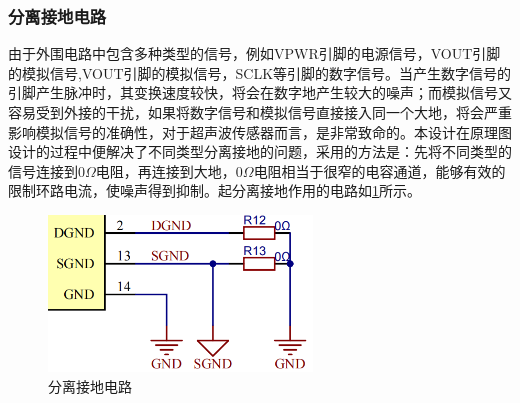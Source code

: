 \subsubsection{分离接地电路}
由于外围电路中包含多种类型的信号，例如VPWR引脚的电源信号，VOUT引脚的模拟信号,VOUT引脚的模拟信号，SCLK等引脚的数字信号。当产生数字信号的引脚产生脉冲时，其变换速度较快，将会在数字地产生较大的噪声；而模拟信号又容易受到外接的干扰，如果将数字信号和模拟信号直接接入同一个大地，将会严重影响模拟信号的准确性，对于超声波传感器而言，是非常致命的。本设计在原理图设计的过程中便解决了不同类型分离接地的问题，采用的方法是：先将不同类型的信号连接到0$\Omega$电阻，再连接到大地，0$\Omega$电阻相当于很窄的电容通道，能够有效的限制环路电流，使噪声得到抑制。起分离接地作用的电路如\ref{分离接地电路}所示。
\begin{figure}[!h]
	\centering
	\includegraphics[width=7cm]{figure/seperate ground.png}
	\caption{分离接地电路}
	\label{分离接地电路}
\end{figure}
